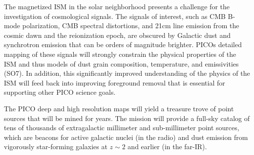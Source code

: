 \documentclass[PICOReport.tex]{subfiles}
\begin{document}
The magnetized ISM in the solar neighborhood presents a challenge for the investigation of cosmological signals. The signals of interest, such as CMB B-mode polarization, CMB spectral distortions, and 21cm line emission from the cosmic dawn and the reionization epoch, are obscured by Galactic dust and synchrotron emission that can be orders of magnitude brighter. PICOs detailed mapping of these signals will strongly constrain the physical properties of the ISM and thus models of dust grain composition, temperature, and emissivities (SO7). In addition, this significantly improved understanding of the physics of the ISM will feed back into improving foreground removal that is essential for supporting other PICO science goals.

The PICO deep and high resolution maps will yield a treasure trove of point sources that will be mined for years. The mission will provide a full-sky catalog of tens of thousands of extragalactic millimeter and sub-millimeter point sources, which are beacons for active galactic nuclei (in the radio) and dust emission from vigorously star-forming galaxies at $z \sim 2$ and earlier (in the far-IR). 


\end{document}
